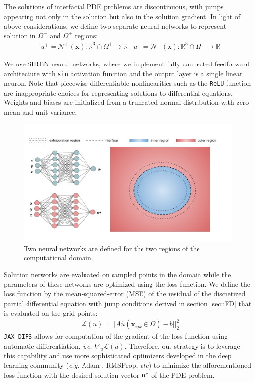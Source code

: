 \documentclass{elsarticle}
\begin{document}
The solutions of interfacial PDE problems are discontinuous, with jumps appearing not only in the solution but also in the solution gradient. In light of above considerations, we define two separate neural networks to represent solution in $\Omega^-$ and $\Omega^+$ regions:
\begin{align*}
& u^+ = \mathcal{N}^+(\mathbf{x}): \mathbb{R}^3\cap \Omega^+ \rightarrow \mathbb{R}  & u^- = \mathcal{N}^-(\mathbf{x}): \mathbb{R}^3\cap \Omega^- \rightarrow \mathbb{R}
\end{align*}

We use SIREN neural networks, where we implement fully connected feedforward architecture with \texttt{sin} activation function and the output layer is a single linear neuron. Note that piecewise differentiable nonlinearities such as the \texttt{ReLU} function are inappropriate choices for representing solutions to differential equations. Weights and biases are initialized from a truncated normal distribution with zero mean and unit variance. 




\begin{figure}[ht]
	\centering
	\includegraphics[width=\linewidth]{./figures/neural_network_arch.png}
	\caption{Two neural networks are defined for the two regions of the computational domain.}
	\label{fig:shapes}
\end{figure}

Solution networks are evaluated on sampled points in the domain while the parameters of these networks are optimized using the loss function. We define the loss function by the mean-squared-error (MSE) of the residual of the discretized partial differential equation with jump conditions derived in section \ref{sec::FD} that is evaluated on the grid points:
\begin{align*}
	&\mathcal{L}(u) = \vert\vert A\hat{u}(\mathbf{x}_{ijk}\in \Omega) - b\vert\vert_2^2  
\end{align*}
\texttt{JAX-DIPS} allows for computation of the gradient of the loss function using automatic differentiation, \textit{i.e.} $\nabla_u \mathcal{L}(u)$. Therefore, our strategy is to leverage this capability and use more sophisticated optimizers developed in the deep learning community (\textit{e.g.} Adam \cite{kingma2014adam}, RMSProp, \textit{etc}) to minimize the afforementioned loss function with the desired solution vector $\rm u^\ast$ of the PDE problem.
\end{document}
